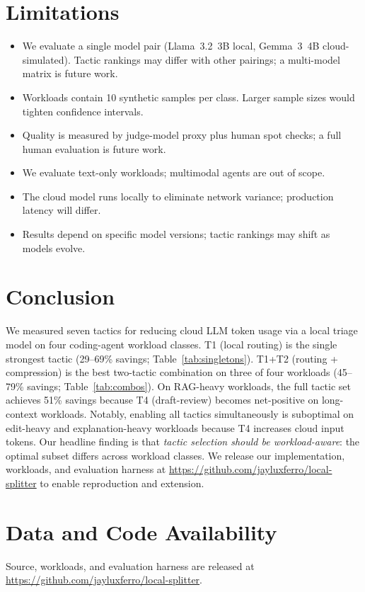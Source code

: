 \documentclass[11pt,a4paper]{article}
\begin{document}
\section{Limitations}
\label{sec:limits}

\begin{itemize}
  \item We evaluate a single model pair (Llama~3.2~3B local,
    Gemma~3~4B cloud-simulated). Tactic rankings may differ
    with other pairings; a multi-model matrix is future work.
  \item Workloads contain 10 synthetic samples per class. Larger
    sample sizes would tighten confidence intervals.
  \item Quality is measured by judge-model proxy plus human spot
    checks; a full human evaluation is future work.
  \item We evaluate text-only workloads; multimodal agents are out
    of scope.
  \item The cloud model runs locally to eliminate network variance;
    production latency will differ.
  \item Results depend on specific model versions; tactic rankings
    may shift as models evolve.
\end{itemize}

\section{Conclusion}

We measured seven tactics for reducing cloud LLM token usage via a
local triage model on four coding-agent workload classes. T1 (local
routing) is the single strongest tactic (29--69\% savings;
Table~\ref{tab:singletons}). T1+T2 (routing + compression) is the best
two-tactic combination on three of four workloads (45--79\% savings;
Table~\ref{tab:combos}). On RAG-heavy workloads, the
full tactic set achieves 51\% savings because T4 (draft-review)
becomes net-positive on long-context workloads. Notably, enabling all
tactics simultaneously is suboptimal on edit-heavy and
explanation-heavy workloads because T4 increases cloud input tokens. Our headline finding is
that \emph{tactic selection should be workload-aware}: the optimal
subset differs across workload classes. We release our
implementation, workloads, and evaluation harness at
\url{https://github.com/jayluxferro/local-splitter} to enable
reproduction and extension.

\section*{Data and Code Availability}
Source, workloads, and evaluation harness are released at
\url{https://github.com/jayluxferro/local-splitter}.
\end{document}
